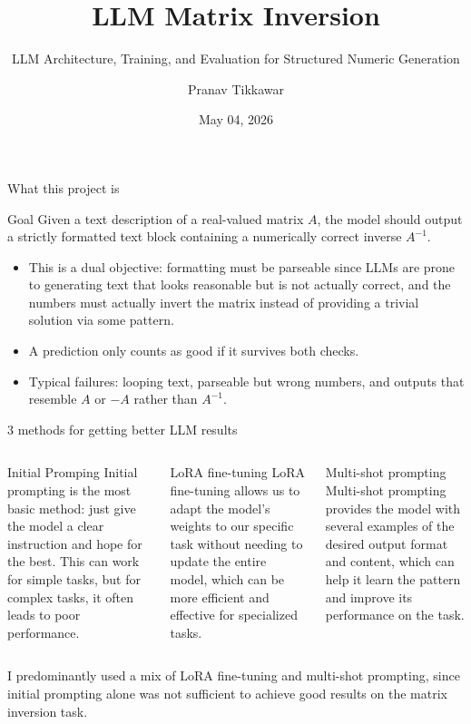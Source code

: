 \documentclass[aspectratio=169,professionalfonts]{beamer}
\title{LLM Matrix Inversion}
\subtitle{LLM Architecture, Training, and Evaluation for Structured Numeric Generation}
\author{Pranav Tikkawar}
\date{May 04, 2026}
\begin{document}
\begin{frame}
  \titlepage
\end{frame}

\begin{frame}{What this project is}
\begin{block}{Goal}
Given a text description of a real-valued matrix $A$, the model should output a strictly formatted text block containing a numerically correct inverse $A^{-1}$.
\end{block}

\vspace{0.5em}
\begin{itemize}[itemsep=0.6em]
    \item This is a \alert{dual objective}: formatting must be parseable since LLMs are prone to generating text that looks reasonable but is not actually correct, and the numbers must actually invert the matrix instead of providing a trivial solution via some pattern.
    \item A prediction only counts as good if it survives both checks.
    \item Typical failures: looping text, parseable but wrong numbers, and outputs that resemble $A$ or $-A$ rather than $A^{-1}$.
\end{itemize}
\end{frame}

\begin{frame}{3 methods for getting better LLM results}
\begin{columns}[T,totalwidth=\textwidth]
\begin{block}{Initial Promping}
Initial prompting is the most basic method: just give the model a clear instruction and hope for the best. This can work for simple tasks, but for complex tasks, it often leads to poor performance.
\end{block} 
\begin{block}{LoRA fine-tuning}
LoRA fine-tuning allows us to adapt the model's weights to our specific task without needing to update the entire model, which can be more efficient and effective for specialized tasks.
\end{block}
\begin{block}{Multi-shot prompting}
Multi-shot prompting provides the model with several examples of the desired output format and content, which can help it learn the pattern and improve its performance on the task.
\end{block}
\end{columns}

\vspace{0.8em}
I predominantly used a mix of LoRA fine-tuning and multi-shot prompting, since initial prompting alone was not sufficient to achieve good results on the matrix inversion task.
    
\end{frame}
\end{document}
